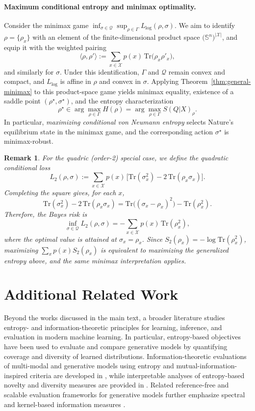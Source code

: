 \documentclass{article}
\newtheorem{remark}{Remark}
\theoremstyle{plain}
\theoremstyle{definition}
\begin{document}
\begin{appendices}
\paragraph{Maximum conditional entropy and minimax optimality.}
Consider the minimax game $\inf_{\sigma\in\mathcal{Q}}\sup_{\rho\in\Gamma}L_{\log}(\rho,\sigma)$.
We aim to identify $\rho=\{\rho_x\}$ with an element of the finite-dimensional product space
$\bigl(\mathbb{S}^n\bigr)^{|\mathcal{X}|}$, and equip it with the weighted pairing
\[
\bigl\langle \rho,\rho'\bigr\rangle
:=
\sum_{x\in\mathcal{X}} p(x)\,\mathrm{Tr}\bigl(\rho_x\rho'_x\bigr),
\]
and similarly for $\sigma$. Under this identification, $\Gamma$ and $\mathcal{Q}$ remain
convex and compact, and $L_{\log}$ is affine in $\rho$ and convex in $\sigma$.
Applying Theorem~\ref{thm:general-minimax} to this product-space game yields minimax
equality, existence of a saddle point $(\rho^\star,\sigma^\star)$, and the entropy
characterization
\[
\rho^\star \in \arg\max_{\rho\in\Gamma} H(\rho)
=
\arg\max_{\rho\in\Gamma} S(Q|X)_\rho.
\]
In particular, \emph{maximizing conditional von Neumann entropy} selects Nature's
equilibrium state in the minimax game, and the corresponding action $\sigma^\star$ is
minimax-robust.

\begin{remark}
For the quadric (order-2) special case, we define the quadratic conditional loss
\[
L_{2}(\rho,\sigma)
:=
\sum_{x\in\mathcal{X}} p(x)\,
\bigl[\mathrm{Tr}(\sigma_x^2)-2\,\mathrm{Tr}(\rho_x\sigma_x)\bigr].
\]
Completing the square gives, for each $x$,
\[
\mathrm{Tr}(\sigma_x^2)-2\,\mathrm{Tr}(\rho_x\sigma_x)
=
\mathrm{Tr}\bigl((\sigma_x-\rho_x)^2\bigr)-\mathrm{Tr}(\rho_x^2).
\]
Therefore, the Bayes risk is
\[
\inf_{\sigma\in\mathcal{Q}} L_2(\rho,\sigma)
=
-\sum_{x\in\mathcal{X}} p(x)\,\mathrm{Tr}(\rho_x^2),
\]
where the optimal value is attained at $\sigma_x=\rho_x$.
Since $S_2(\rho_x)=-\log\mathrm{Tr}(\rho_x^2)$, maximizing
$\sum_x p(x)S_2(\rho_x)$ is equivalent to maximizing the generalized entropy above,
and the same minimax interpretation applies.
\end{remark}
\section{Additional Related Work}

Beyond the works discussed in the main text, a broader literature studies entropy- and information-theoretic principles for learning, inference, and evaluation in modern machine learning. In particular, entropy-based objectives have been used to evaluate and compare generative models by quantifying coverage and diversity of learned distributions. Information-theoretic evaluations of multi-modal and generative models using entropy and mutual-information-inspired criteria are developed in \cite{jalali2023information}, while interpretable analyses of entropy-based novelty and diversity measures are provided in \cite{zhang2024interpretable}. Related reference-free and scalable evaluation frameworks for generative models further emphasize spectral and kernel-based information measures \cite{ospanov2024towards}.


\end{appendices}
\end{document}
